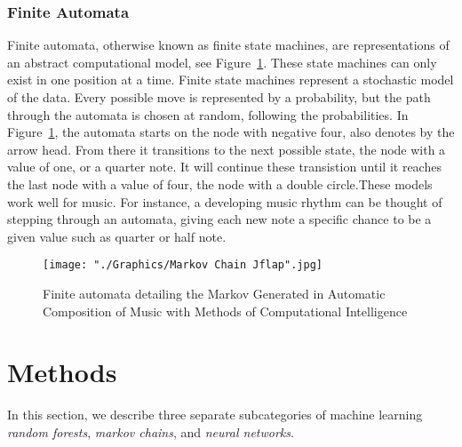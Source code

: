 \documentclass{sig-alternate}
\begin{document}


\subsubsection{Finite Automata}
\label{sec:finiteautomata}
	Finite automata, otherwise known as finite state machines, are representations of an abstract computational model, see Figure~\ref{fig:markovchain1}. These state machines can only exist in one position at a time. Finite state machines represent a stochastic model of the data. Every possible move is represented by a probability, but the path through the automata is chosen at random, following the probabilities. In Figure~\ref{fig:markovchain1}, the automata starts on the node with negative four, also denotes by the arrow head. From there it transitions to the next possible state, the node with a value of one, or a quarter note. It will continue these transistion until it reaches the last node with a value of four, the node with a  double circle.These models work well for music. For instance, a developing music rhythm can be thought of stepping through an automata, giving each new note a specific chance to be a given value such as quarter or half note. 


\begin{figure}[H]
	\texttt{[image: "./Graphics/Markov Chain Jflap".jpg]}
	\caption{Finite automata detailing the Markov Generated in Automatic Composition of Music with Methods of Computational Intelligence}
	\label{fig:markovchain1}
\end{figure}

\section{Methods}
\label{sec:methods}
	In this section, we describe three separate subcategories of machine learning \textit{random forests},\textit{ markov chains}, and \textit{neural networks}.
\end{document}
